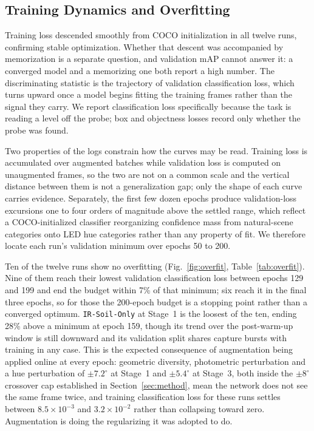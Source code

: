 ﻿\documentclass[journal]{IEEEtran}
\begin{document}
\subsection{Training Dynamics and Overfitting}
\label{sec:dynamics}
Training loss descended smoothly from COCO initialization in all twelve runs, confirming stable optimization. Whether that descent was accompanied by memorization is a separate question, and validation mAP cannot answer it: a converged model and a memorizing one both report a high number. The discriminating statistic is the trajectory of validation classification loss, which turns upward once a model begins fitting the training frames rather than the signal they carry. We report classification loss specifically because the task is reading a level off the probe; box and objectness losses record only whether the probe was found.

Two properties of the logs constrain how the curves may be read. Training loss is accumulated over augmented batches while validation loss is computed on unaugmented frames, so the two are not on a common scale and the vertical distance between them is not a generalization gap; only the shape of each curve carries evidence. Separately, the first few dozen epochs produce validation-loss excursions one to four orders of magnitude above the settled range, which reflect a COCO-initialized classifier reorganizing confidence mass from natural-scene categories onto LED hue categories rather than any property of fit. We therefore locate each run's validation minimum over epochs 50 to 200.

Ten of the twelve runs show no overfitting (Fig.~\ref{fig:overfit}, Table~\ref{tab:overfit}). Nine of them reach their lowest validation classification loss between epochs 129 and 199 and end the budget within 7\% of that minimum; six reach it in the final three epochs, so for those the 200-epoch budget is a stopping point rather than a converged optimum. \texttt{IR-Soil-Only} at Stage~1 is the loosest of the ten, ending 28\% above a minimum at epoch 159, though its trend over the post-warm-up window is still downward and its validation split shares capture bursts with training in any case. This is the expected consequence of augmentation being applied online at every epoch: geometric diversity, photometric perturbation and a hue perturbation of $\pm 7.2^{\circ}$ at Stage~1 and $\pm 5.4^{\circ}$ at Stage~3, both inside the $\pm 8^{\circ}$ crossover cap established in Section~\ref{sec:method}, mean the network does not see the same frame twice, and training classification loss for these runs settles between $8.5 \times 10^{-3}$ and $3.2 \times 10^{-2}$ rather than collapsing toward zero. Augmentation is doing the regularizing it was adopted to do.
\end{document}
